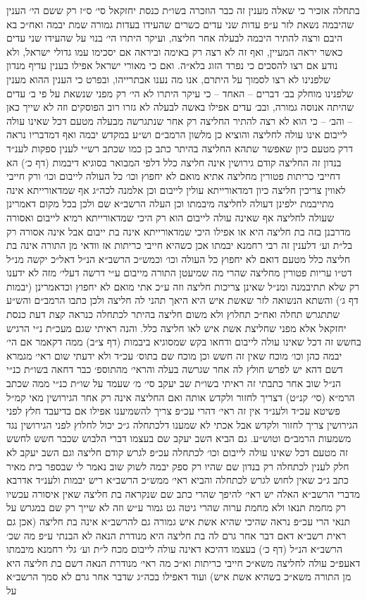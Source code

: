 \documentclass[12pt, openany]{book}
\begin{document}
\begin{multicols}{2}
בתחלה אזכיר כי שאלה מענין זה כבר הוזכרה בשו״ת כנסת יחזקאל סי׳ ס״ז רק ששם הי׳ הענין שהיבמה נשאת לזר ע״פ עדות שני עדים כשרים שהעידו בעדות גמורה שמת יבמה ואח״כ בא היבם ורצה להתיר היבמה לבעלה אחר חליצה, ועיקר היתרו הי׳ בנוי על שהעידו שני עדים כאשר יראה המעיין, ואף זה לא רצה רק באימה וביראה אם יסכימו עמו גדולי ישראל, ולא נודע אם רצו להסכים כי נפרד הזוג בלא״ה. ואם כי מאורי ישראל אפילו בענין עדיף מנדון שלפנינו לא רצו לסמוך על היתרם, אנו מה נענו אבתרייהו, ובפרט כי הענין ההוא מענין שלפנינו מוחלק בב׳ דברים – האחד – כי עיקר היתרו לא הי׳ רק מפני שנשאת על פי ב׳ עדים שהיתה אנוסה גמורה, ובב׳ עדים אפילו באשה לבעלה לא גזרו רוב הפוסקים וזה לא שייך כאן – והב׳ – כי הוא לא רצה להתיר החליצה רק אחר שנתגרשה מבעלה מטעם דכל שאינו עולה לייבום אינו עולה לחליצה והוציא כן מלשון הרמב״ם וש״ע במקדש יבמה ואף דמדבריו נראה דרק מטעם כיון שאפשר שתהא החליצה בהיתר כתב כן כמו שכתב רש״י לענין ספקות לענ״ד בנדון זה החליצה קודם גירושין אינה חליצה כלל דלפי המבואר בסוגיא דיבמות (דף כ׳) הא דחייבי כריתות פטורין מחליצה אתיא מואם לא יחפוץ וכו׳ כל העולה לייבום וכו׳ ורק חייבי לאווין צריכין חליצה כיון דמדאורייתא עולין לייבום וכן אלמנה לכה״ג אף שמדאורייתא אינה מתייבמת ילפינן דעולה לחליצה מיבמתו וכן העלה הרשב״א שם ולכן בכל מקום דאמרינן שעולה לחליצה אף שאינה עולה לייבום הוא רק היכי שמדאורייתא רמיא לייבום ואסורה מדרבנן בזה בת חליצה היא או אפילו היכי שמדאורייתא אינה בת ייבום אבל אינה אסורה רק בל״ת וע׳ דלענין זה רבי רחמנא יבמתו אכן כשהיא חייבי כריתות אז וודאי מן התורה אינה בת חליצה כלל מטעם דואם לא יחפוץ כל העולה וכו׳ וכמש״כ הרשב״א הנ״ל דאל״כ יקשה מנ״ל דט״ו עריות פטורין מחליצה שהרי מה שמיעטן התורה מייבום ע״י דרשה דעלי׳ מזה לא ידענו רק שלא תתיבמנה ומנ״ל שאינן צריכות חליצה וזה ע״כ אתי מואם לא יחפוץ וכדאמרינן (יבמות דף ג׳) והשתא הנשואה לזר שאשת איש היא היאך תהני לה חליצה ולכן כתבו הרמב״ם והש״ע שתתגרש תחלה ואח״כ תחלוץ ולא משום חליצה בהיתר לכתחלה כנראה קצת דעת כנסת יחזקאל אלא מפני שחליצת אשת איש לאו חליצה כלל. והנה ראיתי שגם מעכ״ת נ״י הרגיש בחשש זה דכל שאינו עולה לייבום ודחאו בקש שמסוגיא ביבמות (דף צ״ב) ממה דקאמר אם הי׳ יבמה כהן וכו׳ מוכח שאין זה חשש וכן מוכח שם בתוס׳ עכ״ד ולא ידעתי שום ראי׳ מגמרא דשם דהא יש לפרש חולץ לה אחר שגרשה בעלה והראי׳ מהתוספ׳ כבר דחאה בשו״ת כנ״י הנ״ל שוב אחר כתבתי זה ראיתי בשו״ת שב יעקב סי׳ מ׳ שעמד על שו״ת כנ״י ממה שכתב הרמ״א (סי׳ קנ״ט) דצריך לחזור ולקדש אותה ואם החליצה אינה רק אחר הגירושין מאי קמ״ל פשיטא עכ״ד ולענ״ד אין זה ראי׳ דהרי עכ״פ צריך להשמיענו אפילו אם בדיעבד חלץ לפני הגירושין צריך לחזור ולקדש אבל אכתי לא שמענו דלכתחלה ג״כ יכול לחלוץ לפני הגירושין נגד משמעות הרמב״ם וטוש״ע. גם הביא השב יעקב שם בעצמו דברי הלבוש שכבר חשש לחשש זה מטעם דכל שאינו עולה לייבום וכו׳ לכתחלה עכ״פ לגרש קודם חליצה וגם השב יעקב לא חלק לענין לכתחלה רק בנדון שם שהיו רק ספק יבמה לשוק שוב נאמר לי שבספר בית מאיר כתב ג״כ שאין לחוש לגרש לכתחלה והביא ראי׳ ממש״כ הרשב״א ריש יבמות ולענ״ד אדרבא מדברי הרשב״א האלה יש ראי׳ להיפך שהרי כתב שם שנקראה בת חליצה שאין איסורה עכשיו רק מחמת תנאו ולא מחמת ערוה שהרי גיטה גט גמור ע״ש וזה לא שייך רק שם במגרש על תנאי הרי עכ״פ נראה שהיכי שהיא אשת איש גמורה גם להרשב״א אינה בת חליצה (אכן גם ראית רשב״א דאם דבר אחר גרם לה בת חליצה היא מנודרת הנאה לא הבנתי ע״פ מה שכ׳ הרשב״א הנ״ל (דף כ׳) בעצמו דהיכא דאינה עולה לייבום מכח ל״ת וע׳ גלי רחמנא מיבמתו דאעפ״כ עולה לחליצה משא״כ חייבי כריתות וא״כ מה ראי׳ מנודרת הנאה דשם בת חליצה היא מן התורה משא״כ בשהיא אשת איש) ועוד דאפילו בכה״ג שדבר אחר גרם לא סמך הרשב״א על 
\end{multicols}
\end{document}
